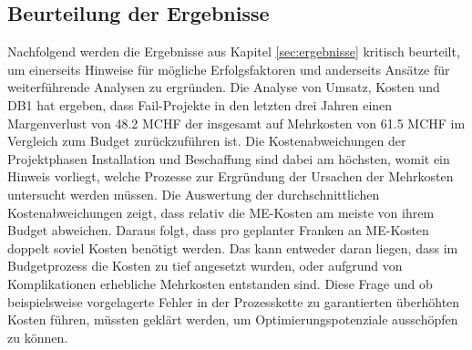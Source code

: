\subsection{Beurteilung der Ergebnisse}\label{sec:krit}
Nachfolgend werden die Ergebnisse aus Kapitel \ref{sec:ergebnisse} kritisch beurteilt, um einerseits Hinweise für mögliche Erfolgsfaktoren und anderseits Ansätze für weiterführende Analysen zu ergründen.
\newline\newline
Die Analyse von Umsatz, Kosten und DB1 hat ergeben, dass Fail-Projekte in den letzten drei Jahren einen Margenverlust von 48.2 MCHF der insgesamt auf Mehrkosten von 61.5 MCHF im Vergleich zum Budget zurückzuführen ist. Die Kostenabweichungen der Projektphasen Installation und Beschaffung sind dabei am höchsten, womit ein Hinweis vorliegt, welche Prozesse zur Ergründung der Ursachen der Mehrkosten untersucht werden müssen. Die Auswertung der durchschnittlichen Kostenabweichungen zeigt, dass relativ die ME-Kosten am meiste von ihrem Budget abweichen. Daraus folgt, dass pro geplanter Franken an ME-Kosten doppelt soviel Kosten benötigt werden. Das kann entweder daran liegen, dass im Budgetprozess die Kosten zu tief angesetzt wurden, oder aufgrund von Komplikationen erhebliche Mehrkosten entstanden sind. Diese Frage und ob beispielsweise vorgelagerte Fehler in der Prozesskette zu garantierten überhöhten Kosten führen, müssten geklärt werden, um Optimierungspotenziale ausschöpfen zu können.
